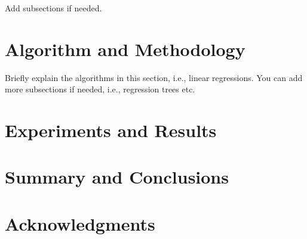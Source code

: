 \documentclass[fleqn,10pt]{SelfArx} %
\begin{document}
Add subsections if needed.
\bigskip
\bigskip


\section{Algorithm and Methodology}

Briefly explain the algorithms in this section, i.e., linear regressions. You can add more subsections if needed, i.e., regression trees etc.


\bigskip
\bigskip
\section{Experiments and Results}


\bigskip
\bigskip
\section{Summary and Conclusions}
\bigskip
\bigskip
\bigskip



\section*{Acknowledgments} %







\end{document}
